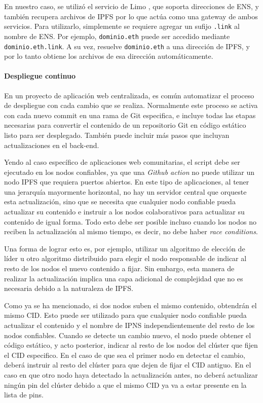 En nuestro caso, se utilizó el servicio de Limo \cite{limo}, que soporta direcciones de ENS, y también recupera archivos de IPFS por lo que actúa como una gateway de ambos servicios. Para utilizarlo, simplemente se requiere agregar un sufijo \texttt{.link} al nombre de ENS. Por ejemplo, \texttt{dominio.eth} puede ser accedido mediante \texttt{dominio.eth.link}. A su vez, resuelve \texttt{dominio.eth} a una dirección de IPFS, y por lo tanto obtiene los archivos de esa dirección automáticamente.

\paragraph{Despliegue continuo}

En un proyecto de aplicación web centralizada, es común automatizar el proceso de despliegue con cada cambio que se realiza. Normalmente este proceso se activa con cada nuevo commit en una rama de Git especifica, e incluye todas las etapas necesarias para convertir el contenido de un repositorio Git en código estático listo para ser desplegado. También puede incluir más pasos que incluyan actualizaciones en el back-end.

Yendo al caso específico de aplicaciones web comunitarias, el script debe ser ejecutado en los nodos confiables, ya que una \textit{Github action} no puede utilizar un nodo IPFS que requiera puertos abiertos. En este tipo de aplicaciones, al tener una jerarquía mayormente horizontal, no hay un servidor central que orqueste esta actualización, sino que se necesita que cualquier nodo confiable pueda actualizar su contenido e instruir a los nodos colaborativos para actualizar su contenido de igual forma. Todo esto debe ser posible incluso cuando los nodos no reciben la actualización al mismo tiempo, es decir, no debe haber \textit{race conditions}.

Una forma de lograr esto es, por ejemplo, utilizar un algoritmo de elección de líder u otro algoritmo distribuido para elegir el nodo responsable de indicar al resto de los nodos el nuevo contenido a fijar. Sin embargo, esta manera de realizar la actualización implica una capa adicional de complejidad que no es necesaria debido a la naturaleza de IPFS.

Como ya se ha mencionado, si dos nodos suben el mismo contenido, obtendrán el mismo CID. Esto puede ser utilizado para que cualquier nodo confiable pueda actualizar el contenido y el nombre de IPNS independientemente del resto de los nodos confiables. Cuando se detecte un cambio nuevo, el nodo puede obtener el código estático, y acto posterior, indicar al resto de los nodos del clúster que fijen el CID especifico. En el caso de que sea el primer nodo en detectar el cambio, deberá instruir al resto del clúster para que dejen de fijar el CID antiguo. En el caso en que otro nodo haya detectado la actualización antes, no deberá actualizar ningún pin del clúster debido a que el mismo CID ya va a estar presente en la lista de pins.

